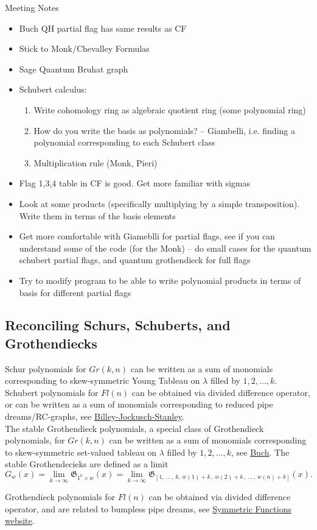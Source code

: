 Meeting Notes
\begin{itemize}
    \item Buch QH partial flag has same results as CF
    \item Stick to Monk/Chevalley Formulas
    \item Sage Quantum Bruhat graph
    \item Schubert calculus: 
    \begin{enumerate}
        \item Write cohomology ring as algebraic quotient ring (some polynomial ring)
        \item How do you write the basis as polynomials? -- Giambelli, i.e. finding a polynomial corresponding to each Schubert class
        \item Multiplication rule (Monk, Pieri)
    \end{enumerate}
    \item Flag 1,3,4 table in CF is good. Get more familiar with sigmas
    \item Look at some products (specifically multiplying by a simple transposition). Write them in terms of the basis elements
    \item Get more comfortable with Giameblli for partial flags, see if you can understand some of the code (for the Monk) -- do small cases for the quantum schubert partial flags, and quantum grothendieck for full flags
    \item Try to modify program to be able to write polynomial products in terms of basis for different partial flags
\end{itemize}

\subsection{Reconciling Schurs, Schuberts, and Grothendiecks}

Schur polynomials for $Gr(k,n)$ can be written as a sum of monomials corresponding to skew-symmetric Young Tableau on $\lambda$ filled by $1, 2, \dots, k$. \\

Schubert polynomials for $Fl(n)$ can be obtained via divided difference operator, or can be written as a sum of monomials corresponding to reduced pipe dreams/RC-graphs, see \href{https://sites.math.washington.edu/~billey/papers/bjs.pdf}{Billey-Jockusch-Stanley}. \\

The stable Grothendieck polynomials, a special class of Grothendieck polynomials, for $Gr(k,n)$ can be written as a sum of monomials corresponding to skew-symmetric set-valued tableau on $\lambda$ filled by $1, 2, \dots, k$, see 
\href{https://sites.math.rutgers.edu/~asbuch/papers/combkth.pdf}{Buch}. The stable Grothendecieks are defined as a limit
\[ 
    G_w(x) = \lim\limits_{k \rightarrow \infty}\mathfrak{G}_{1^k \times w}(x) = \lim\limits_{k \rightarrow \infty}\mathfrak{G}_{[1, \, \dots \,, \, k, \, w(1) + k \,, \,w(2) + k \,, \, \dots \,, \,w(n)+ k]}(x).
\]

Grothendieck polynomials for $Fl(n)$ can be obtained via divided difference operator, and are related to bumpless pipe dreams, see \href{https://www.symmetricfunctions.com/grothendieck.htm}{Symmetric Functions website}.

